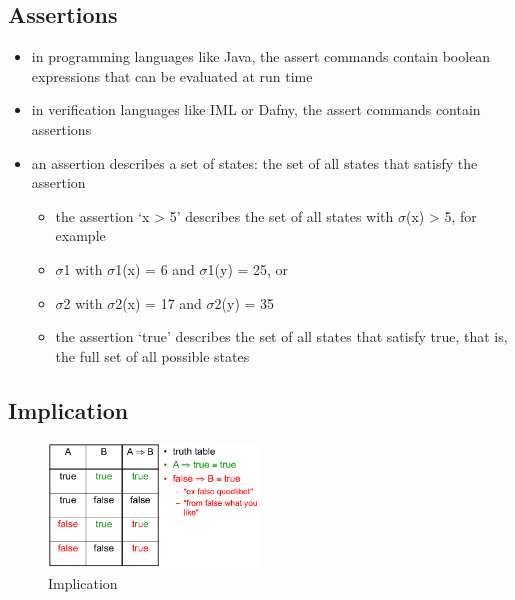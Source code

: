 \hypertarget{assertions}{%
\subsection{Assertions}\label{assertions}}

\begin{itemize}
\tightlist
\item
  in programming languages like Java, the assert commands contain
  boolean expressions that can be evaluated at run time
\item
  in verification languages like IML or Dafny, the assert commands
  contain assertions
\item
  an assertion describes a set of states: the set of all states that
  satisfy the assertion

  \begin{itemize}
  \tightlist
  \item
    the assertion `x \textgreater{} 5' describes the set of all states
    with $\sigma$(x) \textgreater{} 5, for example
  \item
    $\sigma$1 with $\sigma$1(x) = 6 and $\sigma$1(y) = 25, or
  \item
    $\sigma$2 with $\sigma$2(x) = 17 and $\sigma$2(y) = 35
  \item
    the assertion `true' describes the set of all states that satisfy
    true, that is, the full set of all possible states
  \end{itemize}
\end{itemize}

\hypertarget{implication}{%
\subsection{Implication}\label{implication}}

\begin{figure}[H]
\centering
\includegraphics[width=0.5\textwidth]{figures/implication.png}
\caption{Implication}
\end{figure}

